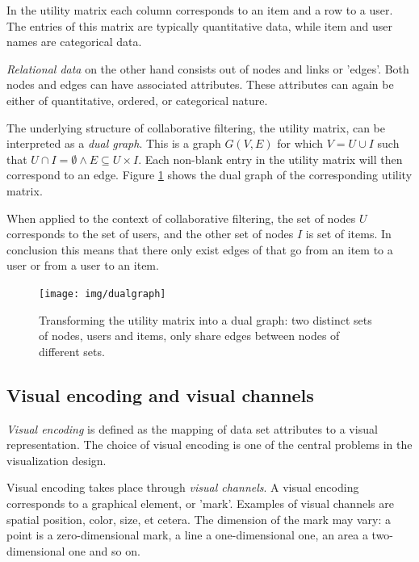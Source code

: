 In the utility matrix each column corresponds to an item and a row to a user. The entries of this matrix are typically quantitative data, while item and user names are categorical data.

\emph{Relational data} on the other hand consists out of nodes and links or 'edges'\cite{keim:2002, shirley:2009}. Both nodes and edges can have associated attributes. These attributes can again be either of quantitative, ordered, or categorical nature.

The underlying structure of collaborative filtering, the utility matrix, can be interpreted as a \emph{dual graph}. This is a graph $G(V,E)$ for which $V = U \cup I$ such that $U \cap I = \emptyset \wedge E \subseteq U \times I$\cite{dekimpe:2007}. Each non-blank entry in the utility matrix will then correspond to an edge. Figure \ref{figure:dualgraph} shows the dual graph of the corresponding utility matrix.

When applied to the context of collaborative filtering, the set of nodes $U$ corresponds to the set of users, and the other set of nodes $I$ is set of items. In conclusion this means that there only exist edges of that go from an item to a user or from a user to an item.

\begin{figure}%
	\begin{center}
		\texttt{[image: img/dualgraph]}
	\end{center}
	\caption{Transforming the utility matrix into a dual graph: two distinct sets of nodes, users and items, only share edges between nodes of different sets.}%
	\label{figure:dualgraph}%
\end{figure}




\subsection{Visual encoding and visual channels}\label{chapter:literature_study:section:interaction:subsection:encoding}


\emph{Visual encoding} is defined as the mapping of data set attributes to a visual representation. The choice of visual encoding is one of the central problems in the visualization design\cite{shirley:2009}.

Visual encoding takes place through \emph{visual channels}. A visual encoding corresponds to a graphical element, or 'mark'. Examples of visual channels are spatial position, color, size, et cetera. The dimension of the mark may vary: a point is a zero-dimensional mark, a line a one-dimensional one, an area a two-dimensional one and so on.

